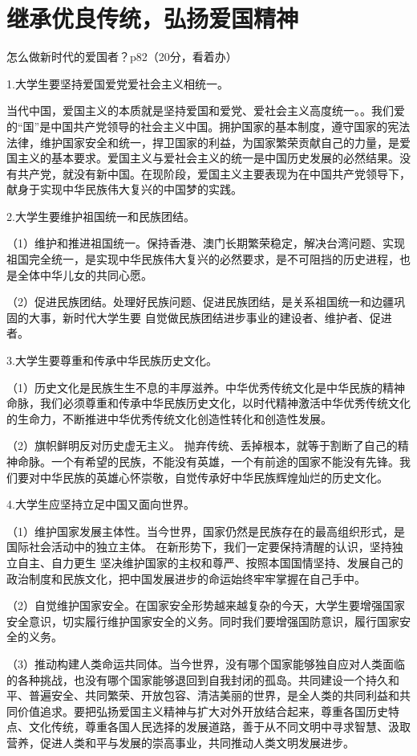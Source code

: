 \documentclass[lang=cn,10pt]{elegantbook}
\begin{document}
	\chapter{继承优良传统，弘扬爱国精神}
	\begin{example}
		怎么做新时代的爱国者？p82（20分，看着办）
	\end{example}
	\begin{solution}
		
		1.大学生要坚持爱国爱党爱社会主义相统一。
		
		当代中国，爱国主义的本质就是坚持爱国和爱党、爱社会主义高度统一。。我们爱的“国”是中国共产党领导的社会主义中国。拥护国家的基本制度，遵守国家的宪法法律，维护国家安全和统一，捍卫国家的利益，为国家繁荣贡献自己的力量，是爱国主义的基本要求。爱国主义与爱社会主义的统一是中国历史发展的必然结果。没有共产党，就没有新中国。在现阶段，爱国主义主要表现为在中国共产党领导下，献身于实现中华民族伟大复兴的中国梦的实践。
		
		2.大学生要维护祖国统一和民族团结。
		
		（1）维护和推进祖国统一。保持香港、澳门长期繁荣稳定，解决台湾问题、实现祖国完全统一，是实现中华民族伟大复兴的必然要求，是不可阻挡的历史进程，也是全体中华儿女的共同心愿。
		
		（2）促进民族团结。处理好民族问题、促进民族团结，是关系祖国统一和边疆巩固的大事，新时代大学生要
		自觉做民族团结进步事业的建设者、维护者、促进者。
		
		3.大学生要尊重和传承中华民族历史文化。
		
		（1）历史文化是民族生生不息的丰厚滋养。中华优秀传统文化是中华民族的精神命脉，我们必须尊重和传承中华民族历史文化，以时代精神激活中华优秀传统文化的生命力，不断推进中华优秀传统文化创造性转化和创造性发展。
		
		（2）旗帜鲜明反对历史虚无主义。
		抛弃传统、丢掉根本，就等于割断了自己的精神命脉。一个有希望的民族，不能没有英雄，一个有前途的国家不能没有先锋。我们要对中华民族的英雄心怀崇敬，自觉传承好中华民族辉煌灿烂的历史文化。
		
		4.大学生应坚持立足中国又面向世界。
		
		（1）维护国家发展主体性。当今世界，国家仍然是民族存在的最高组织形式，是国际社会活动中的独立主体。 在新形势下，我们一定要保持清醒的认识，坚持独立自主、自力更生 坚决维护国家的主权和尊严、按照本国国情坚持、发展自己的政治制度和民族文化，把中国发展进步的命运始终牢牢掌握在自己手中。
		
		（2）自觉维护国家安全。在国家安全形势越来越复杂的今天，大学生要增强国家安全意识，切实履行维护国家安全的义务。同时我们要增强国防意识，履行国家安全的义务。
		
		（3）推动构建人类命运共同体。当今世界，没有哪个国家能够独自应对人类面临的各种挑战，也没有哪个国家能够退回到自我封闭的孤岛。共同建设一个持久和平、普遍安全、共同繁荣、开放包容、清洁美丽的世界，是全人类的共同利益和共同价值追求。要把弘扬爱国主义精神与扩大对外开放结合起来，尊重各国历史特点、文化传统，尊重各国人民选择的发展道路，善于从不同文明中寻求智慧、汲取营养，促进人类和平与发展的崇高事业，共同推动人类文明发展进步。
	\end{solution}
\end{document}
